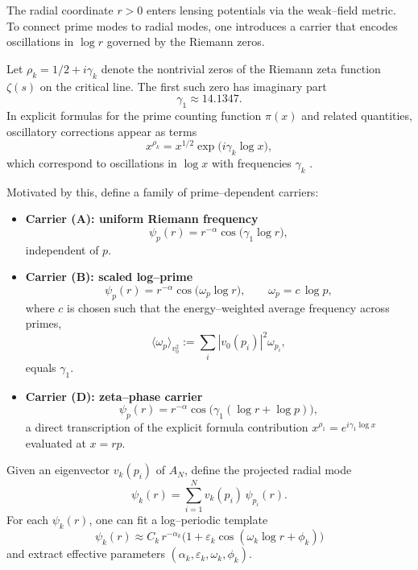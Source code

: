 \documentclass[11pt]{article}
\begin{document}
The radial coordinate $r>0$ enters lensing potentials via the weak--field metric. To connect prime modes to radial modes, one introduces a carrier that encodes oscillations in $\log r$ governed by the Riemann zeros.

Let $\rho_k = 1/2 + i\gamma_k$ denote the nontrivial zeros of the Riemann zeta function $\zeta(s)$ on the critical line. The first such zero has imaginary part
\[
\gamma_1 \approx 14.1347.
\]
In explicit formulas for the prime counting function $\pi(x)$ and related quantities, oscillatory corrections appear as terms
\[
x^{\rho_k} = x^{1/2} \exp\big(i\gamma_k \log x\big),
\]
which correspond to oscillations in $\log x$ with frequencies $\gamma_k$ \cite{ExplicitFormula}.

Motivated by this, define a family of prime--dependent carriers:

\begin{itemize}[leftmargin=*]
  \item \textbf{Carrier (A): uniform Riemann frequency}
  \begin{equation}
    \psi_p(r) = r^{-\alpha} \cos\big(\gamma_1 \log r\big),
  \end{equation}
  independent of $p$.

  \item \textbf{Carrier (B): scaled log--prime}
  \begin{equation}
    \psi_p(r) = r^{-\alpha} \cos\big(\omega_p \log r\big),
    \qquad \omega_p = c\,\log p,
  \end{equation}
  where $c$ is chosen such that the energy--weighted average frequency across primes,
  \[
  \langle \omega_p \rangle_{v_0^2} := \sum_i |v_0(p_i)|^2 \omega_{p_i},
  \]
  equals $\gamma_1$.

  \item \textbf{Carrier (D): zeta--phase carrier}
  \begin{equation}
    \psi_p(r) = r^{-\alpha} \cos\big(\gamma_1(\log r + \log p)\big),
  \end{equation}
  a direct transcription of the explicit formula contribution $x^{\rho_1} = e^{i\gamma_1 \log x}$ evaluated at $x = rp$.
\end{itemize}

Given an eigenvector $v_k(p_i)$ of $A_N$, define the projected radial mode
\begin{equation}
  \psi_k(r) = \sum_{i=1}^N v_k(p_i)\, \psi_{p_i}(r).
\end{equation}
For each $\psi_k(r)$, one can fit a log--periodic template
\begin{equation}
  \psi_k(r) \approx C_k\, r^{-\alpha_k} \big(1 + \varepsilon_k \cos(\omega_k \log r + \phi_k)\big)
\end{equation}
and extract effective parameters $(\alpha_k,\varepsilon_k,\omega_k,\phi_k)$.
\end{document}
